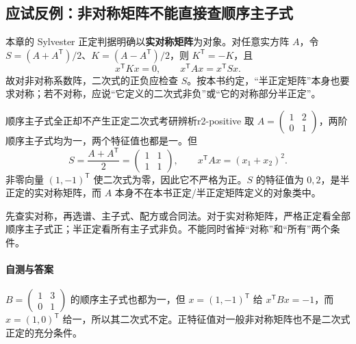 \subsection{应试反例：非对称矩阵不能直接查顺序主子式}\label{r2:positive}
本章的 Sylvester 正定判据明确以\textbf{实对称矩阵}为对象。对任意实方阵 $A$，令 $S=(A+A^{\mathsf T})/2$、$K=(A-A^{\mathsf T})/2$，则 $K^{\mathsf T}=-K$，且
\[
 x^{\mathsf T}Kx=0,\qquad x^{\mathsf T}Ax=x^{\mathsf T}Sx.
\]
故对非对称系数阵，二次式的正负应检查 $S$。按本书约定，“半正定矩阵”本身也要求对称；若不对称，应说“它定义的二次式非负”或“它的对称部分半正定”。

\begin{example}{顺序主子式全正却不产生正定二次式}{考研辨析}{r2-positive}
取 $A=\begin{pmatrix}1&2\\0&1\end{pmatrix}$，两阶顺序主子式均为一，两个特征值也都是一。但
\[
 S=\frac{A+A^{\mathsf T}}2=\begin{pmatrix}1&1\\1&1\end{pmatrix},\qquad
 x^{\mathsf T}Ax=(x_1+x_2)^2.
\]
非零向量 $(1,-1)^{\mathsf T}$ 使二次式为零，因此它不严格为正。$S$ 的特征值为 $0,2$，是半正定的实对称矩阵，而 $A$ 本身不在本书正定/半正定矩阵定义的对象类中。
\end{example}

\begin{warning}
先查实对称，再选谱、主子式、配方或合同法。对于实对称矩阵，严格正定看全部顺序主子式正；半正定看所有主子式非负。不能同时省掉“对称”和“所有”两个条件。
\end{warning}

\paragraph{自测与答案}
$B=\begin{pmatrix}1&3\\0&1\end{pmatrix}$ 的顺序主子式也都为一，但 $x=(1,-1)^{\mathsf T}$ 给 $x^{\mathsf T}Bx=-1$，而 $x=(1,0)^{\mathsf T}$ 给一，所以其二次式不定。正特征值对一般非对称矩阵也不是二次式正定的充分条件。
